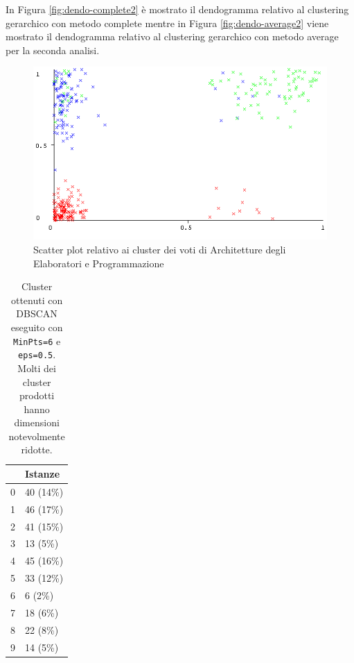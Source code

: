 \documentclass[12pt]{article}
\begin{document}
In Figura \ref{fig:dendo-complete2} è mostrato il dendogramma relativo al clustering gerarchico con metodo complete mentre in Figura \ref{fig:dendo-average2} viene mostrato il dendogramma relativo al clustering gerarchico con metodo average per la seconda analisi. 
\begin{figure}[H]
	\includegraphics[width=\textwidth]{img/ARC-PRG-Cluster.png}
	\captionsetup{justification=centering}
	\caption{Scatter plot relativo ai cluster dei voti di Architetture degli Elaboratori e Programmazione}
	\label{APC}
\end{figure}
\begin{table}[H]
\centering
\begin{tabular}{@{}ll@{}}
\toprule
                        & Istanze  \\\midrule
\multicolumn{1}{l}{0} & 40 (14\%)  \\
\multicolumn{1}{l}{1} & 46 (17\%)  \\
\multicolumn{1}{l}{2} & 41 (15\%)  \\
\multicolumn{1}{l}{3} & 13 (5\%)   \\
\multicolumn{1}{l}{4} & 45 (16\%)  \\
\multicolumn{1}{l}{5} & 33 (12\%)  \\
\multicolumn{1}{l}{6} & 6  (2\%)   \\
\multicolumn{1}{l}{7} & 18 (6\%)   \\
\multicolumn{1}{l}{8} & 22 (8\%)   \\
\multicolumn{1}{l}{9} & 14 (5\%)   \\\bottomrule
\end{tabular}
\caption{Cluster ottenuti con DBSCAN eseguito con \texttt{MinPts=6} e \texttt{eps=0.5}. Molti dei cluster prodotti hanno dimensioni notevolmente ridotte.}
\label{tab:dbscan605}
\end{table}
\end{document}

